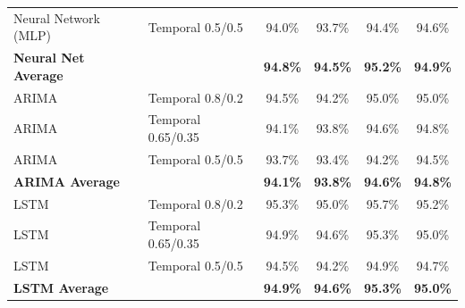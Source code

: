 \documentclass[11pt,a4paper]{article}
\begin{document}
\begin{table}[H]
\begin{tabular}{llcccc}
Neural Network (MLP) & Temporal 0.5/0.5 & 94.0\% & 93.7\% & 94.4\% & 94.6\% \\
\textbf{Neural Net Average} & & \textbf{94.8\%} & \textbf{94.5\%} & \textbf{95.2\%} & \textbf{94.9\%} \\
\midrule
ARIMA & Temporal 0.8/0.2 & 94.5\% & 94.2\% & 95.0\% & 95.0\% \\
ARIMA & Temporal 0.65/0.35 & 94.1\% & 93.8\% & 94.6\% & 94.8\% \\
ARIMA & Temporal 0.5/0.5 & 93.7\% & 93.4\% & 94.2\% & 94.5\% \\
\textbf{ARIMA Average} & & \textbf{94.1\%} & \textbf{93.8\%} & \textbf{94.6\%} & \textbf{94.8\%} \\
\midrule
LSTM & Temporal 0.8/0.2 & 95.3\% & 95.0\% & 95.7\% & 95.2\% \\
LSTM & Temporal 0.65/0.35 & 94.9\% & 94.6\% & 95.3\% & 95.0\% \\
LSTM & Temporal 0.5/0.5 & 94.5\% & 94.2\% & 94.9\% & 94.7\% \\
\textbf{LSTM Average} & & \textbf{94.9\%} & \textbf{94.6\%} & \textbf{95.3\%} & \textbf{95.0\%} \\
\bottomrule
\end{tabular}
\end{table}
\end{document}
